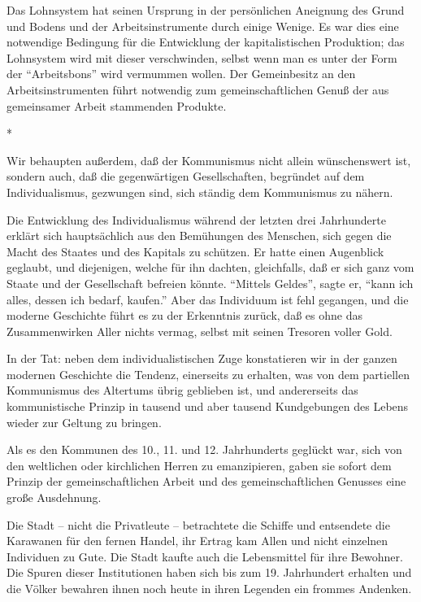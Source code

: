 \documentclass{scrbook}
\begin{document}
Das Lohnsystem hat seinen Ursprung in der persönlichen Aneignung des Grund und Bodens und der Arbeitsinstrumente durch einige Wenige. Es war dies eine notwendige Bedingung für die Entwicklung der kapitalistischen Produktion; das Lohnsystem wird mit dieser verschwinden, selbst wenn man es unter der Form der ``Arbeitsbons'' wird vermummen wollen. Der Gemeinbesitz an den Arbeitsinstrumenten führt notwendig zum gemeinschaftlichen Genuß der aus gemeinsamer Arbeit stammenden Produkte.

\begin{center}*\end{center}

Wir behaupten außerdem, daß der Kommunismus nicht allein wünschenswert ist, sondern auch, daß die gegenwärtigen Gesellschaften, begründet auf dem Individualismus, gezwungen sind, sich ständig dem Kommunismus zu nähern.

Die Entwicklung des Individualismus während der letzten drei Jahrhunderte erklärt sich hauptsächlich aus den Bemühungen des Menschen, sich gegen die Macht des Staates und des Kapitals zu schützen. Er hatte einen Augenblick geglaubt, und diejenigen, welche für ihn dachten, gleichfalls, daß er sich ganz vom Staate und der Gesellschaft befreien könnte. ``Mittels Geldes'', sagte er, ``kann ich alles, dessen ich bedarf, kaufen.'' Aber das Individuum ist fehl gegangen, und die moderne Geschichte führt es zu der Erkenntnis zurück, daß es ohne das Zusammenwirken Aller nichts vermag, selbst mit seinen Tresoren voller Gold.

In der Tat: neben dem individualistischen Zuge konstatieren wir in der ganzen modernen Geschichte die Tendenz, einerseits zu erhalten, was von dem partiellen Kommunismus des Altertums übrig geblieben ist, und andererseits das kommunistische Prinzip in tausend und aber tausend Kundgebungen des Lebens wieder zur Geltung zu bringen.

Als es den Kommunen des 10., 11. und 12. Jahrhunderts geglückt war, sich von den weltlichen oder kirchlichen Herren zu emanzipieren, gaben sie sofort dem Prinzip der gemeinschaftlichen Arbeit und des gemeinschaftlichen Genusses eine große Ausdehnung.

Die Stadt – nicht die Privatleute – betrachtete die Schiffe und entsendete die Karawanen für den fernen Handel, ihr Ertrag kam Allen und nicht einzelnen Individuen zu Gute. Die Stadt kaufte auch die Lebensmittel für ihre Bewohner. Die Spuren dieser Institutionen haben sich bis zum 19. Jahrhundert erhalten und die Völker bewahren ihnen noch heute in ihren Legenden ein frommes Andenken.
\end{document}
